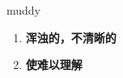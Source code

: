 
\begin{frame}
{\huge muddy}
\begin{center}
\begin{enumerate}\Large
  \item \textbf{浑浊的，不清晰的}
  \item \textbf{使难以理解}
\end{enumerate}
\end{center}
\end{frame}
